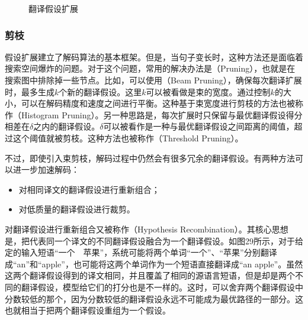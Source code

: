 \begin{figure}[htp]
\centering

\caption{翻译假设扩展}
\label{fig:4-28}
\end{figure}
\vspace{4.0em}

\subsubsection{剪枝}

\parinterval 假设扩展建立了解码算法的基本框架。但是，当句子变长时，这种方法还是面临着搜索空间爆炸的问题。对于这个问题，常用的解决办法是{\small{}}（Pruning），也就是在搜索图中排除掉一些节点。比如，可以使用{\small{}}（Beam Pruning），确保每次翻译扩展时，最多生成$k$个新的翻译假设。这里$k$可以被看做是束的宽度。通过控制$k$的大小，可以在解码精度和速度之间进行平衡。这种基于束宽度进行剪枝的方法也被称作{\small{}}（Histogram Pruning）。另一种思路是，每次扩展时只保留与最优翻译假设得分相差在$\delta$之内的翻译假设。$\delta$可以被看作是一种与最优翻译假设之间距离的阈值，超过这个阈值就被剪枝。这种方法也被称作{\small{}}（Threshold Pruning）。

\parinterval 不过，即使引入束剪枝，解码过程中仍然会有很多冗余的翻译假设。有两种方法可以进一步加速解码：

\begin{itemize}
\vspace{0.5em}
\item 对相同译文的翻译假设进行重新组合；
\vspace{0.5em}
\item 对低质量的翻译假设进行裁剪。
\vspace{0.5em}
\end{itemize}

\parinterval 对翻译假设进行重新组合又被称作{\small{}}（Hypothesis Recombination）。其核心思想是，把代表同一个译文的不同翻译假设融合为一个翻译假设。如图29所示，对于给定的输入短语``一个\ \ 苹果''，系统可能将两个单词``一个''、``苹果''分别翻译成``an''和``apple''，也可能将这两个单词作为一个短语直接翻译成``an apple''。虽然这两个翻译假设得到的译文相同，并且覆盖了相同的源语言短语，但是却是两个不同的翻译假设，模型给它们的打分也是不一样的。这时，可以舍弃两个翻译假设中分数较低的那个，因为分数较低的翻译假设永远不可能成为最优路径的一部分。这也就相当于把两个翻译假设重组为一个假设。

